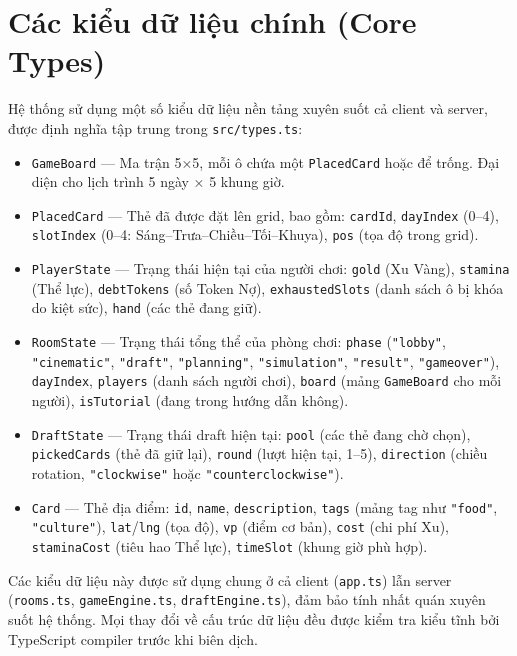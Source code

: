 \newpage

\section{Các kiểu dữ liệu chính (Core Types)}

Hệ thống sử dụng một số kiểu dữ liệu nền tảng xuyên suốt cả client và server, được định nghĩa tập trung trong \texttt{src/types.ts}:

\begin{itemize}[topsep=0pt, itemsep=4pt, leftmargin=1.5cm]
    \item \texttt{GameBoard} — Ma trận 5×5, mỗi ô chứa một \texttt{PlacedCard} hoặc để trống. Đại diện cho lịch trình 5 ngày × 5 khung giờ.

    \item \texttt{PlacedCard} — Thẻ đã được đặt lên grid, bao gồm: \texttt{cardId}, \texttt{dayIndex} (0–4), \texttt{slotIndex} (0–4: Sáng–Trưa–Chiều–Tối–Khuya), \texttt{pos} (tọa độ trong grid).

    \item \texttt{PlayerState} — Trạng thái hiện tại của người chơi: \texttt{gold} (Xu Vàng), \texttt{stamina} (Thể lực), \texttt{debtTokens} (số Token Nợ), \texttt{exhaustedSlots} (danh sách ô bị khóa do kiệt sức), \texttt{hand} (các thẻ đang giữ).

    \item \texttt{RoomState} — Trạng thái tổng thể của phòng chơi: \texttt{phase} (\texttt{"lobby"}, \texttt{"cinematic"}, \texttt{"draft"}, \texttt{"planning"}, \texttt{"simulation"}, \texttt{"result"}, \texttt{"gameover"}), \texttt{dayIndex}, \texttt{players} (danh sách người chơi), \texttt{board} (mảng \texttt{GameBoard} cho mỗi người), \texttt{isTutorial} (đang trong hướng dẫn không).

    \item \texttt{DraftState} — Trạng thái draft hiện tại: \texttt{pool} (các thẻ đang chờ chọn), \texttt{pickedCards} (thẻ đã giữ lại), \texttt{round} (lượt hiện tại, 1–5), \texttt{direction} (chiều rotation, \texttt{"clockwise"} hoặc \texttt{"counterclockwise"}).

    \item \texttt{Card} — Thẻ địa điểm: \texttt{id}, \texttt{name}, \texttt{description}, \texttt{tags} (mảng tag như \texttt{"food"}, \texttt{"culture"}), \texttt{lat}/\texttt{lng} (tọa độ), \texttt{vp} (điểm cơ bản), \texttt{cost} (chi phí Xu), \texttt{staminaCost} (tiêu hao Thể lực), \texttt{timeSlot} (khung giờ phù hợp).
\end{itemize}

Các kiểu dữ liệu này được sử dụng chung ở cả client (\texttt{app.ts}) lẫn server (\texttt{rooms.ts}, \texttt{gameEngine.ts}, \texttt{draftEngine.ts}), đảm bảo tính nhất quán xuyên suốt hệ thống. Mọi thay đổi về cấu trúc dữ liệu đều được kiểm tra kiểu tĩnh bởi TypeScript compiler trước khi biên dịch.
